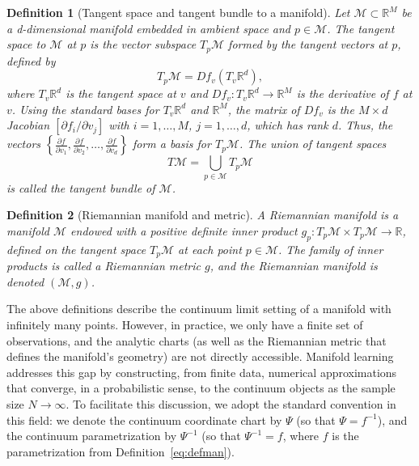 \documentclass{article}
\newtheorem{definition}{Definition}
\begin{document}
\begin{definition}[Tangent space and tangent bundle to a manifold]
\textit{Let $\mathcal{M} \subset \mathbb{R}^M$ be a d-dimensional manifold embedded in ambient space and $p \in \mathcal{M}$. The tangent space to $\mathcal{M}$ at $p$ is the vector subspace $T_{p}\mathcal{M}$ formed by the tangent vectors at $p$, defined by
$$ T_{p}\mathcal{M} = D f_{v}(T_{v}\mathbb{R}^{d}),$$
where $T_{v}\mathbb{R}^{d}$ is the tangent space at $v$ and $Df_v:T_{v}\mathbb{R}^{d}\to \mathbb{R}^M$ is the derivative of $f$ at $v$. Using the standard bases for $T_v\mathbb{R}^d$ and $\mathbb{R}^M$, the matrix of $Df_v$ is the $M \times d$ Jacobian $[\partial f_i/\partial v_j]$ with $i=1,\ldots,M$, $j=1,\ldots,d$, which has rank $d$. Thus, the vectors $\left\{ \frac{\partial f}{\partial v_1}, \frac{\partial f}{\partial v_2}, \dots, \frac{\partial f}{\partial v_d} \right\}$ form a basis for $T_{p}\mathcal{M}$. The union of tangent spaces $$T \mathcal{M} = \bigcup_{p \in \mathcal{M}} T_{p}\mathcal{M}$$ is called the tangent bundle of $\mathcal{M}$.} 
\end{definition}
\begin{definition}[Riemannian manifold and metric]
\textit{A Riemannian manifold is a manifold $\mathcal{M}$ endowed with a positive definite inner product $g_{p}:T_{p}\mathcal{M} \times T_{p}\mathcal{M}\to\mathbb{R}$, defined on the tangent space $T_{p}\mathcal{M}$ at each point $p\in\mathcal{M}$. The family of inner products is called a Riemannian metric $g$, and the Riemannian manifold is denoted $(\mathcal{M},g)$.}
\end{definition}
The above definitions describe the continuum limit setting of a manifold with infinitely many points. However, in practice, we only have a finite set of observations, and the analytic charts (as well as the Riemannian metric that defines the manifold's geometry) are not directly accessible. Manifold learning addresses this gap by constructing, from finite data, numerical approximations that converge, in a probabilistic sense, to the continuum objects as the sample size $N \to \infty$. To facilitate this discussion, we adopt the standard convention in this field: we denote the continuum coordinate chart by $\Psi$ (so that $\Psi = f^{-1}$), and the continuum parametrization by $\Psi^{-1}$ (so that $\Psi^{-1} = f$, where $f$ is the parametrization from Definition~\ref{eq:defman}). 
\end{document}
